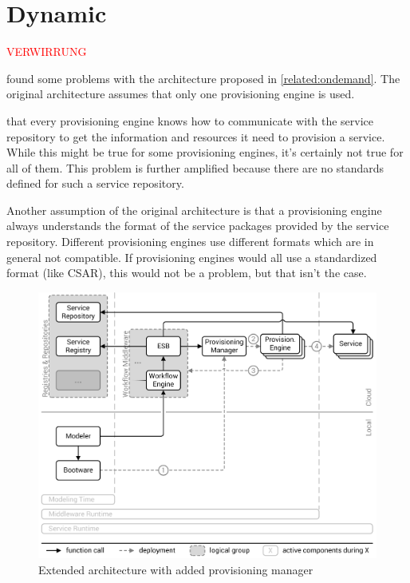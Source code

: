 \section{Dynamic}
\label{related:dynamic}

\textcolor{red}{VERWIRRUNG}

\citeauthor{provisioning:dynamic} found some problems with the architecture proposed in \autoref{related:ondemand}.
The original architecture assumes that only one provisioning engine is used.

that every provisioning engine knows how to communicate with the service repository to get the information and resources it need to provision a service.
While this might be true for some provisioning engines, it's certainly not true for all of them.
This problem is further amplified because there are no standards defined for such a service repository.

Another assumption of the original architecture is that a provisioning engine always understands the format of the service packages provided by the service repository.
Different provisioning engines use different formats which are in general not compatible.
If provisioning engines would all use a standardized format (like CSAR), this would not be a problem, but that isn't the case.

\begin{figure}[!htbp]
	\centering
	\includegraphics[resolution=600]{related/assets/valeri_architecture}
	\caption{Extended architecture with added provisioning manager~\autocite[based on][]{provisioning:dynamic}}
	\label{image:valeri_architecture}
\end{figure}

